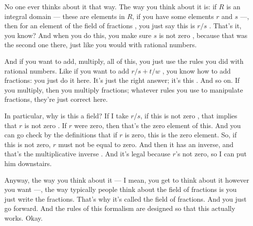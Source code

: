 \begin{speech}[00:01:46 - 00:03:25]
No one ever thinks about it that way. The way you think about it is: if $R$ is an integral domain  --- these are elements in $R$, if you have some elements $r$ and $s$ ---, then for an element of the field of fractions , you just say this is $r/s$ . That's it, you know? And when you do this, you make sure $s$ is not zero , because that was the second one there, just like you would with rational numbers.

And if you want to add, multiply, all of this, you just use the rules you did with rational numbers. Like if you want to add $r/s + t/w$ , you know how to add fractions: you just do it here. It's just the right answer; it's this . And so on. If you multiply, then you multiply fractions; whatever rules you use to manipulate fractions, they're just correct here.

In particular, why is this a field? If I take $r/s$, if this is not zero , that implies that $r$ is not zero . If $r$ were zero, then that's the zero element of this. And you can go check by the definitions that if $r$ is zero, this is the zero element. So, if this is not zero, $r$ must not be equal to zero. And then it has an inverse, and that's the multiplicative inverse . And it's legal because $r$'s not zero, so I can put him downstairs.

Anyway, the way you think about it --- I mean, you get to think about it however you want ---, the way typically people think about the field of fractions is you just write the fractions. That's why it's called the field of fractions. And you just go forward. And the rules of this formalism are designed so that this actually works. Okay.
\end{speech}

